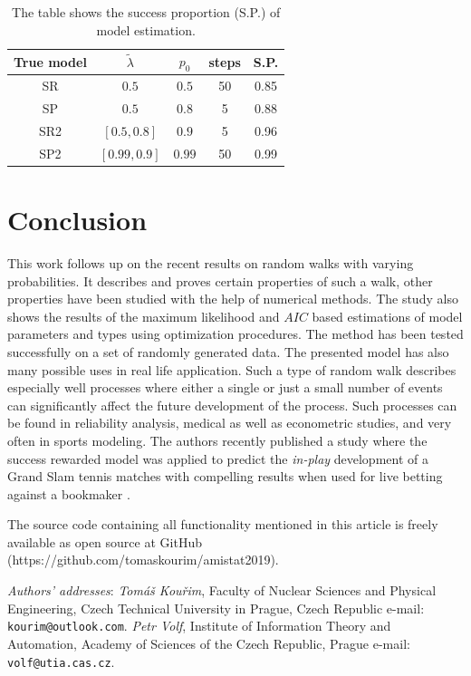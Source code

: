 \documentclass{amsart}
\theoremstyle{definition}
\theoremstyle{plain}
\theoremstyle{plain}
\theoremstyle{plain}
\numberwithin{equation}{section}
\begin{document}
\begin{table}
\centering{}

{\caption{\label{tab:Fitting-results-model}The table shows the success proportion (S.P.) of model estimation.}
\begin{tabular}{|c|c|c|c|c|}
\hline
True model & $\tilde{\lambda}$  & $p_0$  & steps & S.P. \tabularnewline
\hline
SR & $0.5$  & $0.5$  & 50 & 0.85 \tabularnewline
\hline
SP & $0.5$  & $0.8$  & 5 & 0.88 \tabularnewline
\hline
SR2 & $[0.5,0.8]$  & $0.9$  & 5 & 0.96 \tabularnewline
\hline
SP2 & $[0.99,0.9]$  & $0.99$  & 50 & 0.99 \tabularnewline
\hline
\end{tabular}
}
\end{table}

\section{Conclusion\label{sec:Conclusion}}

This work follows up on the recent results on random walks with varying
probabilities. It describes and proves certain properties of such
a walk, other properties have been studied with the help of numerical
methods. The study also shows the results of the maximum likelihood
and $AIC$ based estimations of model parameters and types using optimization
procedures. The method has been tested successfully on a set of randomly
generated data. The presented model has also many possible uses in
real life application. Such a type of random walk describes especially
well processes where either a single or just a small number of events
can significantly affect the future development of the process. Such
processes can be found in reliability analysis, medical as well as
econometric studies, and very often in sports modeling. The authors
recently published a study where the success rewarded model was applied
to predict the \emph{in-play} development of a Grand Slam tennis matches
with compelling results when used for live betting against a bookmaker
\cite{ja2019imam}.

The source code containing all functionality mentioned in this article
is freely available as open source at
GitHub (https://github.com/tomaskourim/amistat2019).





{\small
{\em Authors' addresses}:
{\em Tom\'{a}\v{s} Kou\v{r}im}, Faculty of Nuclear Sciences and Physical Engineering, Czech Technical University in Prague,
Czech Republic
 e-mail: \texttt{kourim@\allowbreak outlook.com}.
{\em Petr Volf}, Institute of Information Theory and Automation, Academy of Sciences of the Czech Republic, Prague
 e-mail: \texttt{volf@\allowbreak utia.cas.cz}.
}
\end{document}

